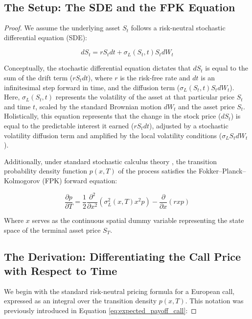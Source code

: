 \documentclass[12pt,oneside]{report}
\theoremstyle{definition}
\theoremstyle{remark}
\begin{document}
\subsection{The Setup: The SDE and the FPK Equation}
\begin{proof}
We assume the underlying asset $S_t$ follows a risk-neutral stochastic differential equation (SDE):

\begin{equation}
dS_t = r S_t dt + \sigma_L(S_t, t) S_t dW_t
\label{eq:sde}
\end{equation}

Conceptually, the stochastic differential equation dictates that $dS_t$ is equal to the sum of the drift term ($r S_t dt$), where $r$ is the risk-free rate and $dt$ is an infinitesimal step forward in time, and the diffusion term ($\sigma_L(S_t, t) S_t dW_t$). Here, $\sigma_L(S_t, t)$ represents the volatility of the asset at that particular price $S_t$ and time $t$, scaled by the standard Brownian motion $dW_t$ and the asset price $S_t$. Holistically, this equation represents that the change in the stock price ($dS_t$) is equal to the predictable interest it earned ($r S_t dt$), adjusted by a stochastic volatility diffusion term and amplified by the local volatility conditions ($\sigma_L S_t dW_t$). 

Additionally, under standard stochastic calculus theory \citep{kolmogorov1931analytischen, shreve2004stochastic}, the transition probability density function $p(x, T)$ of the process satisfies the Fokker--Planck--Kolmogorov (FPK) forward equation:

\begin{equation}
\frac{\partial p}{\partial T} = \frac{1}{2} \frac{\partial^2}{\partial x^2} \left( \sigma_L^2(x, T) x^2 p \right) - \frac{\partial}{\partial x} (r x p)
\label{eq:fpk_equation}
\end{equation}

Where $x$ serves as the continuous spatial dummy variable representing the state space of the terminal asset price $S_T$.

\subsection{The Derivation: Differentiating the Call Price with Respect to Time}

We begin with the standard risk-neutral pricing formula for a European call, expressed as an integral over the transition density $p(x, T)$. This notation was previously introduced in Equation \ref{eq:expected_payoff_call}:


\end{proof}
\end{document}
